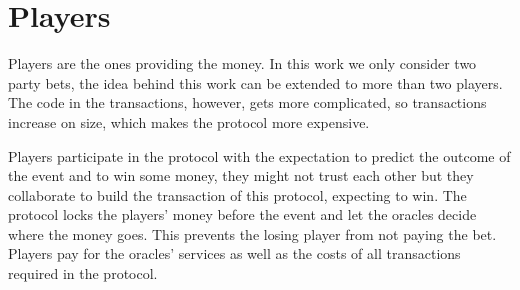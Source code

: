\section{Players}

Players are the ones providing the money.
In this work we only consider two party bets, the idea behind this work can be
extended to more than two players.
The code in the transactions, however,  gets more complicated, so transactions
  increase on size, which makes the protocol more expensive.

Players participate in the protocol with the expectation to predict the
  outcome of the event and to win some money, they might not trust each other but
  they collaborate to build the transaction of this protocol, expecting to win.
The protocol locks the players' money before the event and let the oracles
  decide where the money goes.
This prevents the losing player from not paying the bet.
Players pay for the oracles' services as well as the costs of all transactions
  required in the protocol.
